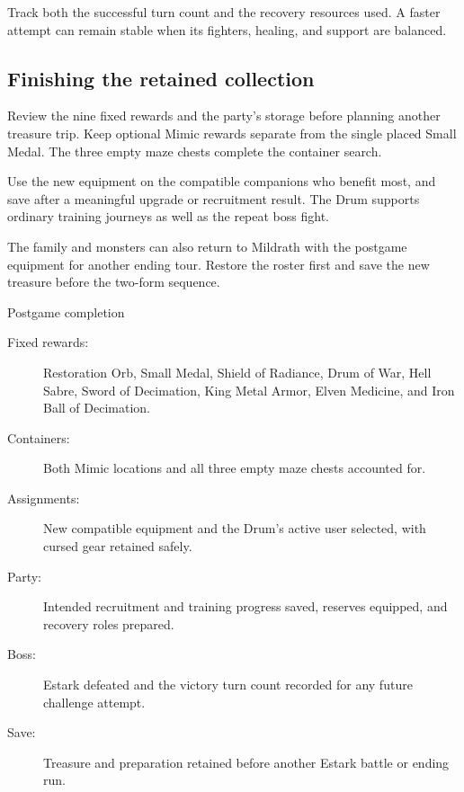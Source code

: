 Track both the successful turn count and the recovery
resources used. A faster attempt can remain stable
when its fighters, healing, and support are balanced.

\subsection*{Finishing the retained collection}

Review the nine fixed rewards and the party's storage
before planning another treasure trip. Keep optional
Mimic rewards separate from the single placed Small Medal.
The three empty maze chests complete the container search.

Use the new equipment on the compatible companions
who benefit most, and save after a meaningful upgrade
or recruitment result. The Drum supports ordinary
training journeys as well as the repeat boss fight.

The family and monsters can also return to Mildrath
with the postgame equipment for another ending tour.
Restore the roster first and save the new treasure
before the two-form sequence.

\begin{routecheck}[breakable=false]{Postgame completion}
\begin{description}
  \item[Fixed rewards:] Restoration Orb, Small Medal,
    Shield of Radiance, Drum of War, Hell Sabre,
    Sword of Decimation, King Metal Armor,
    Elven Medicine, and Iron Ball of Decimation.
  \item[Containers:] Both Mimic locations and all three
    empty maze chests accounted for.
  \item[Assignments:] New compatible equipment and the
    Drum's active user selected, with cursed gear retained safely.
  \item[Party:] Intended recruitment and training progress
    saved, reserves equipped, and recovery roles prepared.
  \item[Boss:] Estark defeated and the victory turn count
    recorded for any future challenge attempt.
  \item[Save:] Treasure and preparation retained before
    another Estark battle or ending run.
\end{description}
\end{routecheck}

